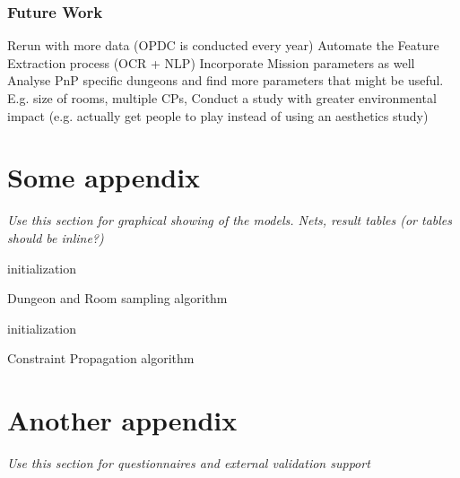 \documentclass{UoYCSproject}
\begin{document}
\subsection{Future Work}
\begin{outline}[enumerate]
  \1 Rerun with more data (OPDC is conducted every year)
  \1 Automate the Feature Extraction process (OCR + NLP)
  \1 Incorporate Mission parameters as well
  \1 Analyse PnP specific dungeons and find more parameters that might be useful. E.g. size of rooms, multiple CPs, 
  \1 Conduct a study with greater environmental impact (e.g. actually get people to play instead of using an aesthetics study)
\end{outline}


\appendix
\chapter{Some appendix}
\label{cha:aA}
\textit{Use this section for graphical showing of the models. Nets, result tables (or tables should be inline?)}
\begin{algorithm}[H]
  \SetAlgoLined
   initialization\;
   \caption{Dungeon and Room sampling algorithm}
   \label{algo:sampling}
  \end{algorithm}

  \begin{algorithm}[H]
    \SetAlgoLined
     initialization\;
     \caption{Constraint Propagation algorithm}
     \label{algo:CSP}
    \end{algorithm}

\chapter{Another appendix}
\label{cha:aB}
\textit{Use this section for questionnaires and external validation support}

\printbibliography
\end{document}
